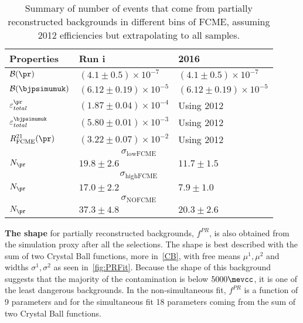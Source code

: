 \begin{table}[ht]
\begin{center}
\begin{tabular}{ l  l  l }
\toprule
Properties & Run \Rn{1} & 2016  \\
\midrule
$\mathcal{B}(\pr)$ & $(4.1\pm0.5)\times 10 ^{-7 }$ &$(4.1\pm0.5)\times 10 ^{-7 }$ \\
$\mathcal{B}(\bjpsimumuk)$ &$(6.12\pm0.19)\times 10 ^{-5 }$ & $(6.12\pm0.19)\times 10 ^{-5 }$ \\
$\varepsilon^{\pr}_{total}$ &  $(1.87\pm0.04)\times 10 ^{-4 }$ & Using 2012  \\
$\varepsilon^{\bjpsimumuk}_{total}$ & $(5.80\pm0.01)\times 10 ^{-3 }$ &  Using 2012 \\
$R_{\mathrm{FCME}}^{21}(\pr)$ & $(3.22\pm0.07)\times 10 ^{-2 }$ &  Using 2012 \\
\midrule
	\multicolumn{3}{c}{{$\sigma_{\mathrm{lowFCME}}$}}  \\
$N_{\pr}$ & $19.8\pm2.6$ & $11.7\pm1.5$ \\
\midrule
	\multicolumn{3}{c}{{$\sigma_{\mathrm{highFCME}}$}}  \\
$N_{\pr}$  & $17.0\pm2.2$ & $7.9\pm1.0$ \\
\midrule
	\multicolumn{3}{c}{{$\sigma_{\mathrm{NOFCME}}$}}  \\
$N_{\pr}$ & $37.3\pm4.8$ & $20.3\pm2.6$ \\
\bottomrule
\end{tabular}
\end{center}
\caption{Summary of number of events that come from partially reconstructed backgrounds in different bins of FCME, assuming 2012 efficiencies but extrapolating to all samples.}
\label{tab:prsum}
\end{table}

\textbf{The shape} for partially reconstructed backgrounds, $f^{PR}$, is also obtained from the simulation proxy after all the selections.
The shape is best described with the sum of two Crystal Ball functions, more in~\autoref{CB}, with free means $\mu^{1},\mu^{2}$ and widths $\sigma^{1},\sigma^{2}$ as seen in~\autoref{fig:PRFit}. Because the shape of this background suggests that the majority of the contamination is below $5000\mevcc$, it is one of the least dangerous backgrounds. In the non-simultaneous fit, $f^{PR}$ is a function of 9 parameters and for the simultaneous fit 18 parameters coming from the sum of two Crystal Ball functions. %


